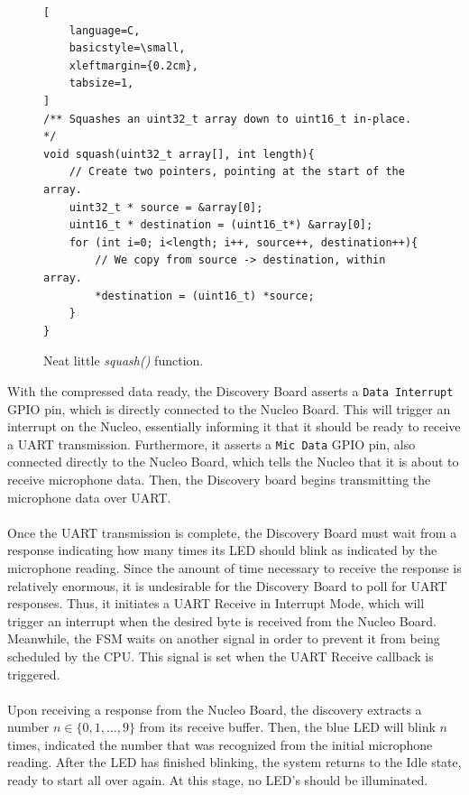 \begin{figure}[h]
\begin{lstlisting}[
	language=C,
	basicstyle=\small,
	xleftmargin={0.2cm},
	tabsize=1,
]
/** Squashes an uint32_t array down to uint16_t in-place. */
void squash(uint32_t array[], int length){
	// Create two pointers, pointing at the start of the array.
	uint32_t * source = &array[0];
	uint16_t * destination = (uint16_t*) &array[0];
	for (int i=0; i<length; i++, source++, destination++){
		// We copy from source -> destination, within array.
		*destination = (uint16_t) *source;
	}
}
\end{lstlisting}
\caption{\label{fig:squash}Neat little \textit{squash()} function.}
\end{figure}







With the compressed data ready, the Discovery Board asserts a \texttt{Data Interrupt} GPIO pin,
which is directly connected to the Nucleo Board. This will trigger an interrupt on the Nucleo,
essentially informing it that it should be ready to receive a UART transmission. Furthermore, it
asserts a \texttt{Mic Data} GPIO pin, also connected directly to the Nucleo Board, which tells the
Nucleo that it is about to receive microphone data. Then, the Discovery
board begins transmitting the microphone data over UART.\\\\
Once the UART transmission is complete, the Discovery Board must wait from a response indicating how
many times its LED should blink as indicated by the microphone reading. Since the amount of time
necessary to receive the response is relatively enormous, it is undesirable for the Discovery Board
to poll for UART responses. Thus, it initiates a UART Receive in Interrupt Mode, which will trigger
an interrupt when the desired byte is received from the Nucleo Board. Meanwhile, the FSM waits on
another signal in order to prevent it from being scheduled by the CPU. This signal is set when the
UART Receive callback is triggered.\\\\
Upon receiving a response from the Nucleo Board, the discovery extracts a number
$n\in\{0,1,\dots,9\}$ from its receive buffer. Then, the blue LED will blink $n$ times, indicated
the number that was recognized from the initial microphone reading. After the LED has finished
blinking, the system returns to the Idle state, ready to start all over again. At this stage, no
LED's should be illuminated.
